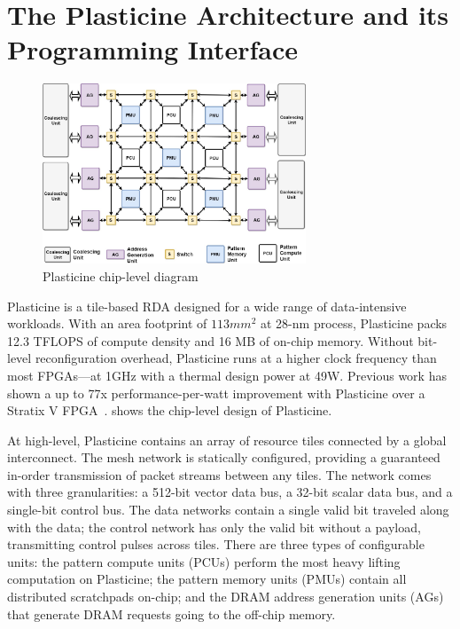 \section{The Plasticine Architecture and its Programming Interface}

\begin{figure}
\centering
\includegraphics[width=0.7\textwidth]{figs/plasticine.pdf}
\caption[Plasticine chip-level architecture]{Plasticine chip-level diagram}
\label{fig:plasticine}
\end{figure}


Plasticine is a tile-based RDA designed for a wide range of data-intensive
workloads.
With an area footprint of $113mm^2$ at 28-nm process, Plasticine packs 12.3 TFLOPS of compute
density and 16 MB of on-chip memory. 
Without bit-level reconfiguration overhead,
Plasticine runs at a higher clock frequency than most FPGAs---at 1GHz with a thermal design power at 49W. 
Previous work has shown a up to 77x performance-per-watt improvement with Plasticine over a Stratix
V FPGA~\cite{plasticine}.
 shows the chip-level design of Plasticine.

At high-level, Plasticine contains an array of resource tiles connected by a global interconnect.
The mesh network is statically configured, providing a guaranteed in-order transmission
of packet streams between any tiles.
The network comes with three granularities: a 512-bit vector data bus, a 32-bit scalar data bus, and a
single-bit control bus.
The data networks contain a single valid bit traveled along with the data;
the control network has only the valid bit without a payload, transmitting control pulses across tiles.
There are three types of configurable units: the pattern compute units (PCUs) perform the most
heavy lifting computation on Plasticine; the pattern memory units (PMUs) contain all distributed
scratchpads on-chip; and the DRAM address generation units (AGs) that generate DRAM requests going to
the off-chip memory.

